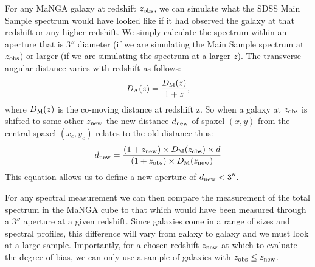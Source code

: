 For any MaNGA galaxy at redshift $z_{\rm obs}$, we can simulate what
the SDSS Main Sample spectrum would have looked like if it had observed the 
galaxy at that redshift or any higher redshift. We simply calculate the 
spectrum within an aperture that is 3$''$ diameter (if we are simulating 
the Main Sample spectrum at $z_{\rm obs}$) or larger (if we are simulating
the spectrum at a larger $z$).
The transverse angular distance varies with redshift as follows:
$$D_{\rm A}(z) = \frac{D_{\rm M}(z)}{1+z}, $$
where $D_{\rm M}(z)$ is the co-moving distance at redshift z.
So when a galaxy at $z_{\rm obs}$ is shifted to some other
$z_{\rm new}$ the new distance $d_{\rm new}$ of spaxel $(x,y)$ 
from the central spaxel $(x_{c},y_{c})$ relates to the old distance thus:
$$ d_{\rm new} = \frac{(1+z_{\rm new})\times D_{\rm M}(z_{\rm obs}) \times d}{(1+z_{\rm obs}) \times  D_{\rm M}(z_{\rm new})} $$
This equation allows us to define a new aperture of $d_{\rm new} < 3''$.

For any spectral measurement we can then compare the measurement
of the total spectrum in the MaNGA cube to that which would have been
measured through a 3$''$ aperture at a given redshift. Since galaxies
come in a range of sizes and spectral profiles, this difference
will vary from galaxy to galaxy and we must look at a large sample.
Importantly, for a chosen redshift $z_{\rm new}$ at which to evaluate
the degree of bias, we can only use a sample of galaxies with 
$z_{\rm obs} \le z_{\rm new}$.

